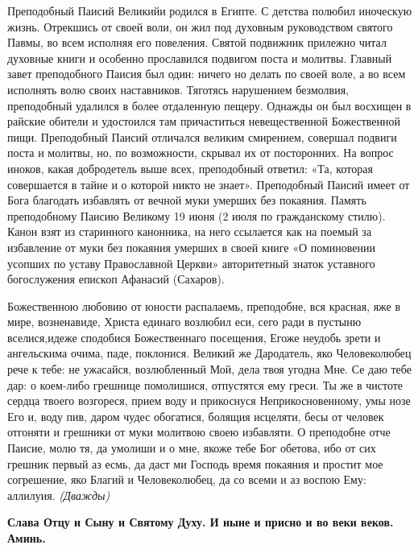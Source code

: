 

\label{_text903.htm}



Преподобный Паисий Великийи родился в Египте. С детства полюбил иноческую жизнь. Отрекшись от своей воли, он жил под духовным руководством святого Павмы, во всем исполняя его повеления. Святой подвижник прилежно читал духовные книги и особенно прославился подвигом поста и молитвы. Главный завет преподобного Паисия был один:
ничего но делать по своей воле, а во всем исполнять волю своих наставников. Тяготясь нарушением безмолвия, преподобный удалился в более отдаленную пещеру. Однажды он был восхищен в райские обители и удостоился там причаститься невещественной Божественной пищи. Преподобный Паисий отличался великим смирением, совершал подвиги поста и молитвы, но, по возможности, скрывал их от посторонних. На вопрос иноков, какая добродетель выше всех, преподобный ответил: «Та, которая совершается в тайне и о которой никто не знает». Преподобный Паисий
имеет от Бога благодать избавлять от вечной муки умерших без покаяния. Память преподобному Паисию Великому 19 июня (2 июля по гражданскому стилю). Канон взят из старинного канонника, на него ссылается как на поемый за избавление от муки без покаяния умерших в своей книге «О поминовении усопших по уставу Православной Церкви» авторитетный знаток уставного богослужения епископ Афанасий (Сахаров).


\bigskip


Божественною любовию от юности распалаемь, преподобне, вся красная, яже в мире, возненавиде, Христа единаго возлюбил еси, сего ради в пустыню вселися,идеже сподобися Божественнаго посещения, Егоже неудобь зрети и ангельскима очима, паде, поклонися. Великий же Дародатель, яко Человеколюбец рече к тебе: не ужасайся, возлюбленный Мой, дела твоя угодна Мне. Се даю тебе дар: о коем-либо грешнице помолишися, отпустятся ему греси. Ты же в чистоте сердца твоего возгореся, прием воду и прикоснуся Неприкосновенному, умы нозе Его и, воду пив, даром чудес обогатися, болящия исцеляти, бесы от человек отгоняти и грешники от муки молитвою своею избавляти. О преподобне отче Паисие, молю тя, да умолиши и о мне, якоже тебе Бог обетова, ибо от сих грешник первый аз есмь, да даст ми Господь время покаяния и простит мое согрешение, яко Благий и Человеколюбец, да со всеми и аз воспою Ему: аллилуия. \itshape (Дважды)\normalfont{}


\bfseries Слава Отцу и Сыну и Святому Духу. И ныне и присно и во веки веков. Аминь.\normalfont{}


